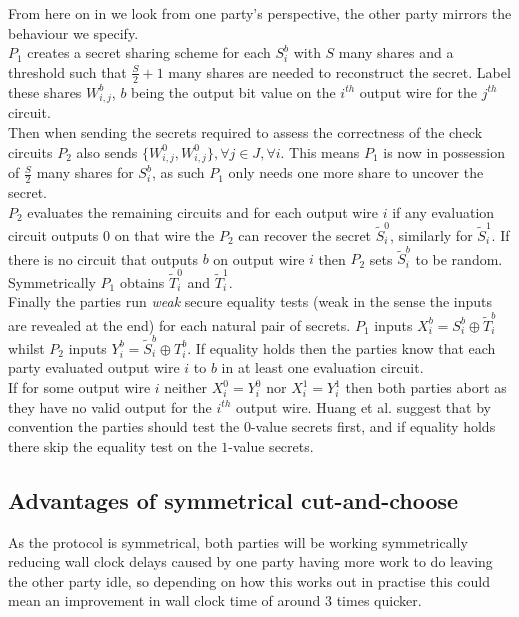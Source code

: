 \documentclass[ %
                    author={Nicholas Tutte},
                supervisor={Prof. Nigel Smart},
                    degree={MEng},
                     title={Secure Two Party Computation},
                  subtitle={A practical comparison of recent protocols},
                      type={Research - GG1K},
                      year={2015} ]{dissertation}
\begin{document}
				From here on in we look from one party's perspective, the other party mirrors the behaviour we specify.\\

				$P_1$ creates a secret sharing scheme for each $S_i^b$ with $S$ many shares and a threshold such that $\frac{S}{2} + 1$ many shares are needed to reconstruct the secret. Label these shares $W_{i, j}^b$, $b$ being the output bit value on the $i^{th}$ output wire for the $j^{th}$ circuit.\\

				Then when sending the secrets required to assess the correctness of the check circuits $P_2$ also sends $\{W_{i, j}^0, W_{i, j}^0\}, \forall j \in J, \forall i$. This means $P_1$ is now in possession of $\frac{S}{2}$ many shares for $S_i^b$, as such $P_1$ only needs one more share to uncover the secret.\\

				$P_2$ evaluates the remaining circuits and for each output wire $i$ if any evaluation circuit outputs $0$ on that wire the $P_2$ can recover the secret $\tilde S_i^0$, similarly for $\tilde S_i^1$. If there is no circuit that outputs $b$ on output wire $i$ then $P_2$ sets $\tilde S_i^b$ to be random. Symmetrically $P_1$ obtains $\tilde T_i^0$ and $\tilde T_i^1$.\\

				Finally the parties run \emph{weak} secure equality tests (weak in the sense the inputs are revealed at the end) for each natural pair of secrets. $P_1$ inputs $X_i^b = S_i^b \oplus \tilde T_i^b$ whilst $P_2$ inputs $Y_i^b = \tilde S_i^b \oplus T_i^b$. If equality holds then the parties know that each party evaluated output wire $i$ to $b$ in at least one evaluation circuit.\\

				If for some output wire $i$ neither $X_i^0 = Y_i^0$ nor $X_i^1 = Y_i^1$ then both parties abort as they have no valid output for the $i^{th}$ output wire. Huang et al. suggest that by convention the parties should test the $0$-value secrets first, and if equality holds there skip the equality test on the $1$-value secrets.\\

				

			\subsection{Advantages of symmetrical cut-and-choose}
				As the protocol is symmetrical, both parties will be working symmetrically reducing wall clock delays caused by one party having more work to do leaving the other party idle, so depending on how this works out in practise this could mean an improvement in wall clock time of around $3$ times quicker.\\
\end{document}
